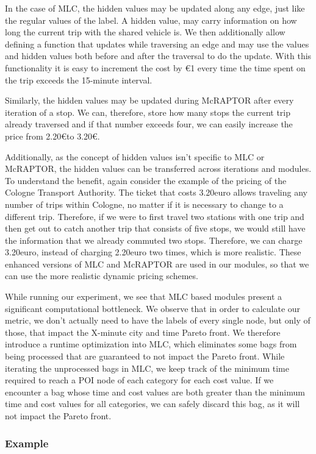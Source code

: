 In the case of MLC, the hidden values may be updated along any edge, just like the regular values of the label.
A hidden value, may carry information on how long the current trip with the shared vehicle is.
We then additionally allow defining a function that updates while traversing an edge and may use the values and hidden values both before and after the traversal to do the update.
With this functionality it is easy to increment the cost by \euro{1} every time the time spent on the trip exceeds the 15-minute interval.

Similarly, the hidden values may be updated during McRAPTOR after every iteration of a stop.
We can, therefore, store how many stops the current trip already traversed and if that number exceeds four, we can easily increase the price from 2.20\euro to 3.20\euro.

Additionally, as the concept of hidden values isn't specific to MLC or McRAPTOR, the hidden values can be transferred across iterations and modules.
To understand the benefit, again consider the example of the pricing of the Cologne Transport Authority.
The ticket that costs 3.20euro allows traveling any number of trips within Cologne, no matter if it is necessary to change to a different trip.
Therefore, if we were to first travel two stations with one trip and then get out to catch another trip that consists of five stops, we would still have the information that we already commuted two stops.
Therefore, we can charge 3.20euro, instead of charging 2.20euro two times, which is more realistic.
These enhanced versions of MLC and McRAPTOR are used in our modules, so that we can use the more realistic dynamic pricing schemes.

While running our experiment, we see that MLC based modules present a significant computational bottleneck.
We observe that in order to calculate our metric, we don't actually need to have the labels of every single node, but only of those, that impact the X-minute city and time Pareto front.
We therefore introduce a runtime optimization into MLC, which eliminates some bags from being processed that are guaranteed to not impact the Pareto front.
While iterating the unprocessed bags in MLC, we keep track of the minimum time required to reach a POI node of each category for each cost value.
If we encounter a bag whose time and cost values are both greater than the minimum time and cost values for all categories, we can safely discard this bag, as it will not impact the Pareto front.


\subsubsection{Example}
\label{subsubsec:example}

